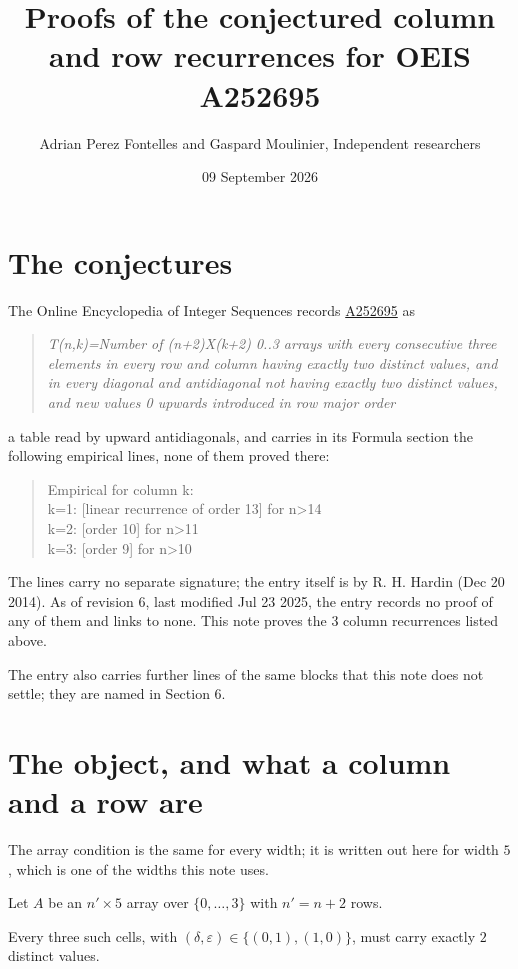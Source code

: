 \documentclass[11pt]{article}
\title{Proofs of the conjectured column and row recurrences for OEIS A252695}
\author{Adrian Perez Fontelles and Gaspard Moulinier, Independent researchers}
\date{09 September 2026}
\theoremstyle{definition}
\begin{document}
\maketitle
\section{The conjectures}

The Online Encyclopedia of Integer Sequences records \href{https://oeis.org/A252695}{A252695} as

\begin{quote}\itshape T(n,k)=Number of (n+2)X(k+2) 0..3 arrays with every consecutive three elements in every row and column having exactly two distinct values, and in every diagonal and antidiagonal not having exactly two distinct values, and new values 0 upwards introduced in row major order\end{quote}

a table read by upward antidiagonals, and carries in its Formula section the following empirical lines, none of them proved there:

\begin{quote}\ttfamily Empirical for column k:\\
k=1: [linear recurrence of order 13] for n>14\\k=2: [order 10] for n>11\\k=3: [order 9] for n>10\end{quote}

The lines carry no separate signature; the entry itself is by R. H. Hardin (Dec 20 2014). As of revision 6, last modified Jul 23 2025, the entry records no proof of any of them and links to none. This note proves the 3 column recurrences listed above.

The entry also carries further lines of the same blocks that this note does not settle; they are named in Section 6.

\section{The object, and what a column and a row are}

The array condition is the same for every width; it is written out here for width $5$, which is one of the widths this note uses.

Let $A$ be an $n' \times 5$ array over $\{0,\dots,3\}$ with $n' = n + 2$ rows.

Every three such cells, with $(\delta,\varepsilon) \in \{(0,1), (1,0)\}$, must carry exactly $2$ distinct values.
\end{document}
